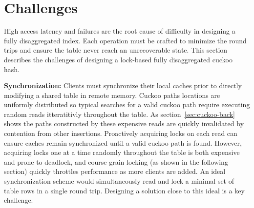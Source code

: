 \section{Challenges}
\label{sec:problems}

High access latency and failures are the root cause of
difficulty in designing a fully disaggregated index. Each
operation must be crafted to minimize the round trips and
ensure the table never reach an unrecoverable state. This
section describes the challenges of designing a lock-based
fully disaggregated cuckoo hash.

\textbf{Synchronization:} Clients must synchronize their
local caches prior to directly modifying a shared table in
remote memory. Cuckoo paths locations are uniformly
distributed so typical searches for a valid cuckoo path
require executing random reads itteratitivly throughout the
table. As section~\ref{sec:cuckoo-back} shows the paths
constructed by these expensive reads are quickly
invalidated by contention from other insertions.
Proactively acquiring locks on each read can ensure caches
remain synchronized until a valid cuckoo path is found.
However, acquiring locks one at a time randomly throughout
the table is both expensive and prone to deadlock, and course
grain locking (as shown in the following section) quickly
throttles performance as more clients are added. An ideal
synchronization scheme would simultaneously read and lock a
minimal set of table rows in a single round trip. Designing
a solution close to this ideal is a key challenge.



